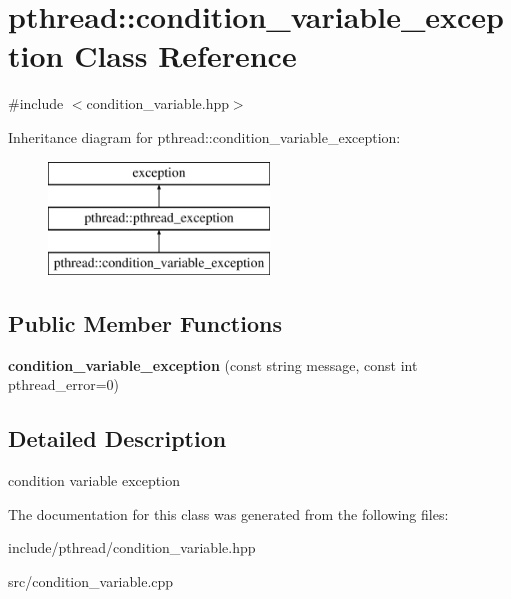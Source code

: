 \hypertarget{classpthread_1_1condition__variable__exception}{}\section{pthread\+:\+:condition\+\_\+variable\+\_\+exception Class Reference}
\label{classpthread_1_1condition__variable__exception}


{\ttfamily \#include $<$condition\+\_\+variable.\+hpp$>$}

Inheritance diagram for pthread\+:\+:condition\+\_\+variable\+\_\+exception\+:\begin{figure}[H]
\begin{center}
\leavevmode
\includegraphics[height=3.000000cm]{classpthread_1_1condition__variable__exception}
\end{center}
\end{figure}
\subsection*{Public Member Functions}
\begin{DoxyCompactItemize}
\item 
{\bfseries condition\+\_\+variable\+\_\+exception} (const string message, const int pthread\+\_\+error=0)\hypertarget{classpthread_1_1condition__variable__exception_a9a19a956e60876f215b0631184060f23}{}\label{classpthread_1_1condition__variable__exception_a9a19a956e60876f215b0631184060f23}

\end{DoxyCompactItemize}


\subsection{Detailed Description}
condition variable exception 

The documentation for this class was generated from the following files\+:\begin{DoxyCompactItemize}
\item 
include/pthread/condition\+\_\+variable.\+hpp\item 
src/condition\+\_\+variable.\+cpp\end{DoxyCompactItemize}
